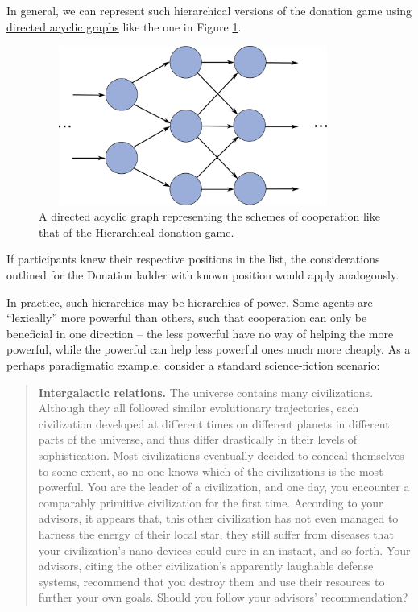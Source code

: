 In general, we can represent such hierarchical versions of the donation
game using
\href{https://en.wikipedia.org/wiki/Directed_acyclic_graph}{directed
acyclic graphs} like the one in Figure \ref{donation-DAG}.

\begin{figure}[h!]
    \centering
    \includegraphics[width=3.98958in,height=2.05728in]{figs/donation-DAG}
    \caption{A directed acyclic graph representing the schemes of cooperation like that of the
    Hierarchical donation game.}
    \label{donation-DAG}
\end{figure}

If participants knew their respective positions in the list, the
considerations outlined for the Donation ladder with known position
would apply analogously.

In practice, such hierarchies may be hierarchies of power. Some agents
are ``lexically'' more powerful than others, such that cooperation can
only be beneficial in one direction -- the less powerful have no way of
helping the more powerful, while the powerful can help less powerful
ones much more cheaply. As a perhaps paradigmatic example, consider a
standard science-fiction scenario:

\begin{quote}
\textbf{Intergalactic relations.} The universe contains many
civilizations. Although they all followed similar evolutionary
trajectories, each civilization developed at different times on
different planets in different parts of the universe, and thus differ
drastically in their levels of sophistication. Most civilizations
eventually decided to conceal themselves to some extent, so no one knows
which of the civilizations is the most powerful. You are the leader of a
civilization, and one day, you encounter a comparably primitive
civilization for the first time. According to your advisors, it appears
that, this other civilization has not even managed to harness the energy
of their local star, they still suffer from diseases that your
civilization's nano-devices could cure in an instant, and so forth. Your
advisors, citing the other civilization's apparently laughable defense
systems, recommend that you destroy them and use their resources to
further your own goals. Should you follow your advisors' recommendation?
\end{quote}

